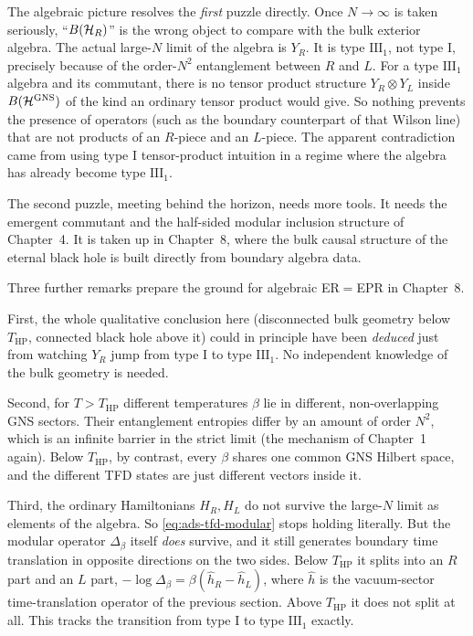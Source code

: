 The algebraic picture resolves the \emph{first} puzzle directly. Once $N\to\infty$ is taken seriously,
``$B(\mathcal{H}_R)$'' is the wrong object to compare with the bulk exterior algebra. The actual large-$N$ limit of the
algebra is $Y_R$. It is type $\mathrm{III}_1$, not type I, precisely because of the order-$N^2$ entanglement
between $R$ and $L$. For a type $\mathrm{III}_1$ algebra and its commutant, there is no tensor product structure
$Y_R\otimes Y_L$ inside $B(\mathcal{H}^{\text{GNS}})$ of the kind an ordinary tensor product would give. So nothing
prevents the presence of operators (such as the boundary counterpart of that Wilson line) that are not products
of an $R$-piece and an $L$-piece. The apparent contradiction came from using type I tensor-product intuition in
a regime where the algebra has already become type $\mathrm{III}_1$.

The second puzzle, meeting behind the horizon, needs more tools. It needs the emergent commutant and the
half-sided modular inclusion structure of Chapter~4. It is taken up in Chapter~8, where the bulk causal
structure of the eternal black hole is built directly from boundary algebra data.

Three further remarks prepare the ground for algebraic ER$=$EPR in Chapter~8.

First, the whole qualitative conclusion here (disconnected bulk geometry below $T_{\text{HP}}$, connected black
hole above it) could in principle have been \emph{deduced} just from watching $Y_R$ jump from type I to type
$\mathrm{III}_1$. No independent knowledge of the bulk geometry is needed.

Second, for $T>T_{\text{HP}}$ different temperatures $\beta$ lie in different, non-overlapping GNS sectors.
Their entanglement entropies differ by an amount of order $N^2$, which is an infinite barrier in the strict
limit (the mechanism of Chapter~1 again). Below $T_{\text{HP}}$, by contrast, every $\beta$ shares one common GNS
Hilbert space, and the different TFD states are just different vectors inside it.

Third, the ordinary Hamiltonians $H_R,H_L$ do not survive the large-$N$ limit as elements of the algebra. So
\eqref{eq:ads-tfd-modular} stops holding literally. But the modular operator $\Delta_\beta$ itself \emph{does}
survive, and it still generates boundary time translation in opposite directions on the two sides. Below
$T_{\text{HP}}$ it splits into an $R$ part and an $L$ part, $-\log\Delta_\beta=\beta(\hat h_R-\hat h_L)$, where
$\hat h$ is the vacuum-sector time-translation operator of the previous section. Above $T_{\text{HP}}$ it does
not split at all. This tracks the transition from type I to type $\mathrm{III}_1$ exactly.

